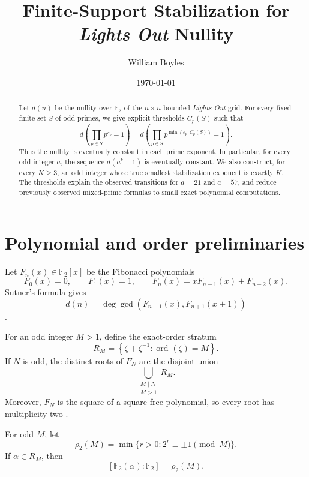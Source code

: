 \documentclass[a4paper]{article}
\newcommand{\F}{\mathbb{F}}
\newcommand{\ord}[2][]{\operatorname{ord}_{#1}\!\left(#2\right)}
\begin{document}
\title{Finite-Support Stabilization for \textit{Lights Out} Nullity}
\author{William Boyles}
\date{\today}
\maketitle

\begin{abstract}
	Let $d(n)$ be the nullity over $\F_2$ of the $n\times n$ bounded \textit{Lights Out} grid.
	For every fixed finite set $S$ of odd primes, we give explicit thresholds $C_p(S)$ such that
	\[
		d\!\left(\prod_{p\in S}p^{e_p}-1\right)
		=
		d\!\left(\prod_{p\in S}p^{\min(e_p,C_p(S))}-1\right).
	\]
	Thus the nullity is eventually constant in each prime exponent.
	In particular, for every odd integer $a$, the sequence $d(a^k-1)$ is eventually constant.
	We also construct, for every $K\geq3$, an odd integer whose true smallest stabilization exponent is exactly $K$.
	The thresholds explain the observed transitions for $a=21$ and $a=57$, and reduce previously observed mixed-prime formulas to small exact polynomial computations.
\end{abstract}

\section{Polynomial and order preliminaries}

Let $F_n(x)\in\F_2[x]$ be the Fibonacci polynomials
\[
	F_0(x)=0,\qquad F_1(x)=1,\qquad
	F_n(x)=xF_{n-1}(x)+F_{n-2}(x).
\]
Sutner's formula gives
\begin{equation}\label{eq:nullity}
	d(n)=\deg\gcd\!\left(F_{n+1}(x),F_{n+1}(x+1)\right)
\end{equation}
\cite{Sutner2000}.

For an odd integer $M>1$, define the exact-order stratum
\[
	R_M=\left\{\zeta+\zeta^{-1}:\ord{\zeta}=M\right\}.
\]
If $N$ is odd, the distinct roots of $F_N$ are the disjoint union
\begin{equation}\label{eq:strata}
	\bigcup_{\substack{M\mid N\\M>1}}R_M.
\end{equation}
Moreover, $F_N$ is the square of a square-free polynomial, so every root has multiplicity two \cite{HUNZIKER2004465}.

For odd $M$, let
\[
	\rho_2(M)=\min\{r>0:2^r\equiv\pm1\pmod M\}.
\]
If $\alpha\in R_M$, then
\begin{equation}\label{eq:degree}
	[\F_2(\alpha):\F_2]=\rho_2(M).
\end{equation}
\end{document}
